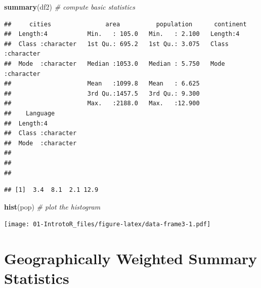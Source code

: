 \documentclass[
]{book}
\newenvironment{Shaded}{\begin{snugshade}}{\end{snugshade}}
\newcommand{\CommentTok}[1]{\textcolor[rgb]{0.56,0.35,0.01}{\textit{#1}}}
\newcommand{\FunctionTok}[1]{\textcolor[rgb]{0.13,0.29,0.53}{\textbf{#1}}}
\newcommand{\NormalTok}[1]{#1}
\newcommand{\OtherTok}[1]{\textcolor[rgb]{0.56,0.35,0.01}{#1}}
\newcommand{\SpecialCharTok}[1]{\textcolor[rgb]{0.81,0.36,0.00}{\textbf{#1}}}
\begin{document}
\begin{Shaded}
\begin{Highlighting}[]
\FunctionTok{summary}\NormalTok{(df2) }\CommentTok{\# compute basic statistics}
\end{Highlighting}
\end{Shaded}

\begin{verbatim}
##     cities               area          population      continent        
##  Length:4           Min.   : 105.0   Min.   : 2.100   Length:4          
##  Class :character   1st Qu.: 695.2   1st Qu.: 3.075   Class :character  
##  Mode  :character   Median :1053.0   Median : 5.750   Mode  :character  
##                     Mean   :1099.8   Mean   : 6.625                     
##                     3rd Qu.:1457.5   3rd Qu.: 9.300                     
##                     Max.   :2188.0   Max.   :12.900                     
##    Language        
##  Length:4          
##  Class :character  
##  Mode  :character  
##                    
##                    
## 
\end{verbatim}

\begin{Shaded}
\end{Shaded}

\begin{verbatim}
## [1]  3.4  8.1  2.1 12.9
\end{verbatim}

\begin{Shaded}
\begin{Highlighting}[]
\FunctionTok{hist}\NormalTok{(pop) }\CommentTok{\# plot the histogram}
\end{Highlighting}
\end{Shaded}

\texttt{[image: 01-IntrotoR\_files/figure-latex/data-frame3-1.pdf]}

\hypertarget{geographically-weighted-summary-statistics}{%
\chapter{Geographically Weighted Summary Statistics}\label{geographically-weighted-summary-statistics}}
\end{document}
